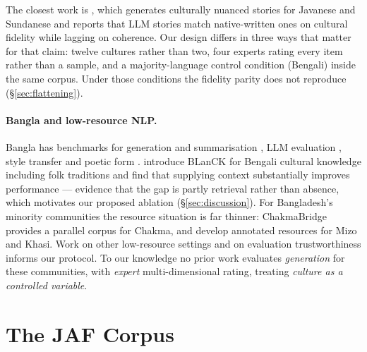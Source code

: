 \documentclass[11pt]{article}
\begin{document}
The closest work is \citet{pranida-etal-2025-culturally}, which generates
culturally nuanced stories for Javanese and Sundanese and reports that LLM
stories match native-written ones on cultural fidelity while lagging on
coherence. Our design differs in three ways that matter for that claim: twelve
cultures rather than two, four experts rating every item rather than a sample,
and a majority-language control condition (Bengali) inside the same corpus.
Under those conditions the fidelity parity does not reproduce
(\S\ref{sec:flattening}).

\paragraph{Bangla and low-resource NLP.}
Bangla has benchmarks for generation and summarisation
\cite{bhattacharjee-etal-2023-banglanlg,khan-etal-2023-banglachq}, LLM
evaluation \cite{kabir-etal-2024-benllm}, style transfer
\cite{mukherjee-etal-2023-low} and poetic form \cite{amina-etal-2025-form}.
\citet{chowdhury-etal-2025-facts} introduce BLanCK for Bengali cultural
knowledge including folk traditions and find that supplying context
substantially improves performance --- evidence that the gap is partly
retrieval rather than absence, which motivates our proposed ablation
(\S\ref{sec:discussion}). For Bangladesh's minority communities the resource
situation is far thinner: ChakmaBridge \cite{rahman-etal-2025-chakmabridge}
provides a parallel corpus for Chakma, and \citet{ghosh-etal-2025-towards}
develop annotated resources for Mizo and Khasi. Work on other low-resource
settings \cite{azime-etal-2024-walia,meaney-etal-2024-testing,razumovskaia-etal-2024-little}
and on evaluation trustworthiness \cite{bhandari-brennan-2023-trustworthiness}
informs our protocol. To our knowledge no prior work evaluates
\emph{generation} for these communities, with \emph{expert} multi-dimensional
rating, treating \emph{culture as a controlled variable}.

\section{The JAF Corpus}
\label{sec:corpus}
\end{document}
